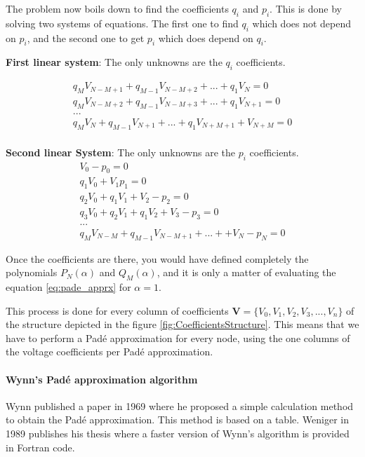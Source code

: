 \documentclass[a4paper,twoside,fleqn]{tufte-book}
\begin{document}
The problem now boils down to find the coefficients $q_i$ and $p_i$. This is done by solving two systems of equations. The first one to find $q_i$ which does not depend on $p_i$, and the second one to get $p_i$ which does depend on $q_i$.

\textbf{First linear system}: The only unknowns are the $q_i$ coefficients.

\begin{equation}
\begin{matrix}
q_M V_{N-M+1} + q_{M-1}V_{N-M+2}+...+q_1V_N = 0\\
q_M V_{N-M+2} + q_{M-1}V_{N-M+3}+...+q_1V_{N+1} = 0\\
...\\
q_M V_{N} + q_{M-1}V_{N+1}+...+q_1V_{N+M+1} + V_{N+M} = 0\\
\end{matrix}
\end{equation}

\textbf{Second linear System}: The only unknowns are the $p_i$ coefficients.
\begin{equation}
\begin{matrix}
V_0 - p_0=0\\
q_1V_0 + V_1  p_1=0\\
q_2V_0 + q_1V_1+V_2-p_2=0\\
q_3V_0 + q_2V_1 + q_1V_2 + V_3 - p_3 = 0\\
...\\
q_MV_{N-M} + q_{M-1}V_{N-M+1} + ... + +V_N - p_N=0
\end{matrix}
\end{equation}

Once the coefficients are there, you would have defined completely the polynomials $P_N(\alpha)$ and $Q_M(\alpha)$, and it is only a matter of evaluating the equation \ref{eq:pade_apprx} for $\alpha=1$.\newline


This process is done for every column of coefficients $\textbf{V}=\{V_0, V_1,V_2,V_3, ...,V_n\}$ of the structure depicted in the figure \ref{fig:CoefficientsStructure}. This means that we have to perform a Pad\'e approximation for every node, using the one columns of the voltage coefficients per Pad\'e approximation.

\paragraph{Wynn's Pad\'e approximation algorithm}

Wynn published a paper in 1969 where he proposed a simple calculation method to obtain the Pad\'e approximation. This method is based on a table. Weniger in 1989 publishes his thesis where a faster version of Wynn's algorithm is provided in Fortran code. 
\end{document}
